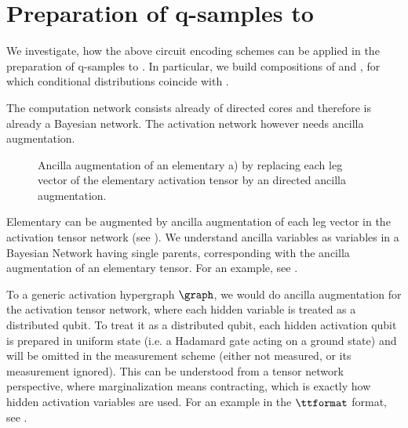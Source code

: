 \section{Preparation of q-samples to \CompActNets{}}\label{sec:canQSample}


We investigate, how the above circuit encoding schemes can be applied in the preparation of q-samples to \ComputationActivationNetworks{}.
In particular, we build compositions of \computationCircuits{} and \activationCircuits{}, for which conditional distributions coincide with \ComputationActivationNetworks{}.

The computation network consists already of directed cores and therefore is already a Bayesian network.
The activation network however needs ancilla augmentation.

\begin{figure}[t]
    \begin{center}
        
    \end{center}
    \caption{Ancilla augmentation of an elementary \ComputationActivationNetwork{} a) by replacing each leg vector of the elementary activation tensor by an directed ancilla augmentation.}
    \label{fig:canElementaryAugmentation}
\end{figure}

Elementary \ComputationActivationNetworks{} can be augmented by ancilla augmentation of each leg vector in the activation tensor network (see ).
We understand ancilla variables as variables in a Bayesian Network having single parents, corresponding with the ancilla augmentation of an elementary tensor.
For an example, see .

To a generic activation hypergraph $\graph$, we would do ancilla augmentation for the activation tensor network, where each hidden variable is treated as a distributed qubit.
To treat it as a distributed qubit, each hidden activation qubit is prepared in uniform state (i.e. a Hadamard gate acting on a ground state) and will be omitted in the measurement scheme (either not measured, or its measurement ignored).
This can be understood from a tensor network perspective, where marginalization means contracting, which is exactly how hidden activation variables are used.
For an example in the $\ttformat$ format, see .

